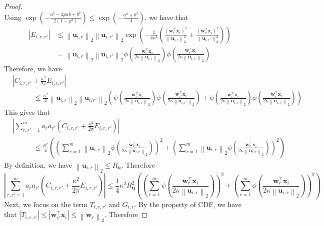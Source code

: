 \documentclass[10pt]{article} %
\theoremstyle{definition}
\theoremstyle{plain}
\newcommand{\paren}[1]{\left(#1\right)}
\newcommand{\norm}[1]{\left\|#1\right\|}
\def\bfu{{\mathbf{u}}}\def\bfv{{\mathbf{v}}}\def\bfw{{\mathbf{w}}}\def\bfx{{\mathbf{x}}}
\begin{document}
\begin{proof}
\[    \]
    Using $\exp\paren{-\frac{a^2- 2\rho ab + b^2}{2\paren{1-\rho^2}}}\leq \exp\paren{-\frac{a^2+b^2}{4}}$, we have that
    \begin{align*}
        \left|E_{i,r,r'}\right| & \leq \norm{\bfu_{i,r}}_2\norm{\bfu_{i,r'}}_2\exp\paren{-\frac{1}{4\kappa^2}\paren{\frac{\paren{\bfw_r^\top\bfx_i}^2}{\norm{\bfu_{i,r}}_2^2} + \frac{\paren{\bfw_{r'}^\top\bfx_i}^2}{\norm{\bfu_{i,r'}}_2^2}}}\\
        & = \norm{\bfu_{i,r}}_2\norm{\bfu_{i,r'}}_2\phi\paren{\frac{\bfw_r^\top\bfx_i}{2\kappa\norm{\bfu_{i,r}}_2}}\phi\paren{\frac{\bfw_{r'}^\top\bfx_i}{2\kappa\norm{\bfu_{i,r'}}_2}}
    \end{align*}
    Therefore, we have
    \begin{align*}
        & \left|C_{i,r,r'} + \frac{\kappa^2}{2\pi}E_{i,r,r'}\right|\\
        &\quad\quad\quad \leq \frac{\kappa^2}{4}\norm{\bfu_{i,r}}_2\norm{\bfu_{i,r'}}_2\paren{\psi\paren{\frac{\bfw_r^\top\bfx_i}{2\kappa\norm{\bfu_{i,r}}_2}}\psi\paren{\frac{\bfw_{r'}^\top\bfx_i}{2\kappa\norm{\bfu_{i,r'}}_2}} + \phi\paren{\frac{\bfw_r^\top\bfx_i}{2\kappa\norm{\bfu_{i,r}}_2}}\phi\paren{\frac{\bfw_{r'}^\top\bfx_i}{2\kappa\norm{\bfu_{i,r'}}_2}}}
    \end{align*}
    This gives that
    \begin{equation}
        \label{eq:C_plus_E_bound}
        \begin{aligned}
            & \left|\sum_{r,r'=1}^ma_ra_{r'}\paren{C_{i,r,r'} + \frac{\kappa^2}{2\pi}E_{i,r,r'}}\right|\\
            &\quad\quad\quad  \leq \frac{\kappa^2}{4}\paren{\paren{\sum_{r=1}^m\norm{\bfu_{i,r}}_2\psi\paren{\frac{\bfw_r^\top\bfx_i}{2\kappa\norm{\bfu_{i,r}}_2}}}^2 + \paren{\sum_{r=1}^m\norm{\bfu_{i,r}}_2\phi\paren{\frac{\bfw_r^\top\bfx_i}{2\kappa\norm{\bfu_{i,r}}_2}}}^2}
        \end{aligned}
    \end{equation}
    By definition, we have $\norm{\bfu_{i,r}}_2\leq R_{\bfu}$. Therefore
    \[
        \left|\sum_{r,r'=1}^ma_ra_{r'}\paren{C_{i,r,r'} + \frac{\kappa^2}{2\pi}E_{i,r,r'}}\right| \leq \frac{1}{4}\kappa^2R_{\bfu}^2\paren{\paren{\sum_{r=1}^m\psi\paren{\frac{\bfw_r^\top\bfx_i}{2\kappa\norm{\bfu_{i,r}}_2}}}^2 + \paren{\sum_{r=1}^m\phi\paren{\frac{\bfw_r^\top\bfx_i}{2\kappa\norm{\bfu_{i,r}}_2}}}^2}
    \]
    Next, we focus on the term $T_{i,r,r'}$ and $G_{i,r}$. By the property of CDF, we have that $\left|T_{i,r,r'}\right| \leq \left|\bfw_{r'}^\top\bfx_i\right| \leq \norm{\bfw_r}_2$. Therefore

\end{proof}
\end{document}
